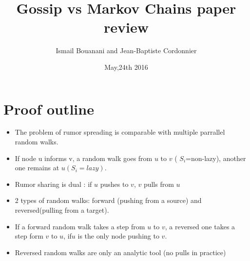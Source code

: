 \documentclass{beamer}
\begin{document}
\title {Gossip vs Markov Chains paper review}
\author{Ismail Bouanani and Jean-Baptiste Cordonnier}
\date{May,24th 2016}
\section {Proof outline}




	\begin{frame}
	\begin{itemize}

    \frametitle{ Approximation via Random walks}
    
    \item The problem of rumor spreading is comparable with multiple parrallel     random walks.
   \item  	If node u informs  v, a random walk goes from $u$ to $v$ ( $S_i$=non-lazy), another one remains at $u(S_i=lazy)$. 
   \begin{figure}[h]
\centering
{}

\label{fig:lazyFSM}
\end{figure}

\end{itemize}

	\end{frame}
\begin{frame}
\begin{itemize}
\frametitle{Forward and reversed random walks}
\item Rumor sharing is dual : if $u$ pushes to $v$, $v$ pulls from $u$
\item 2 types of random walks: forward (pushing from a source) and reversed(pulling from a target). 
\item If a forward random walk takes a step from $u$ to $v$, a reversed one   takes a step form $v$ to $u$, if$u$ is the only node pushing to $v$.
\item Reversed random walks are only an analytic tool (no pulls in practice)
 
\end {itemize}

\end{frame}
\end{document}
